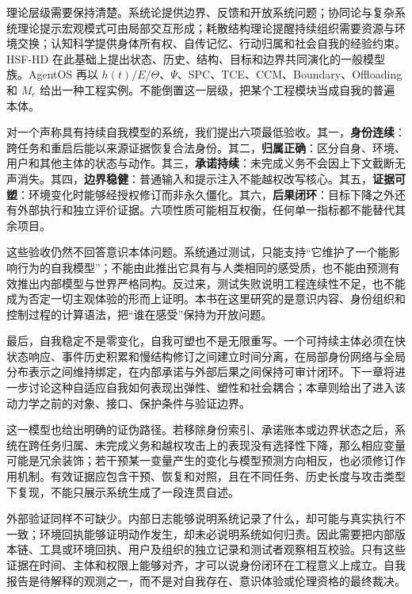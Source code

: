 理论层级需要保持清楚。系统论提供边界、反馈和开放系统问题；协同论与复杂系统理论提示宏观模式可由局部交互形成；耗散结构理论提醒持续组织需要资源与环境交换；认知科学提供身体所有权、自传记忆、行动归属和社会自我的经验约束。HSF-HD 在此基础上提出状态、历史、结构、目标和边界共同演化的一般模型族。AgentOS 再以 $h(t)/E/\Theta$、$\Psi$、SPC、TCE、CCM、Boundary、Offloading 和 $M_e$ 给出一种工程实例。不能倒置这一层级，把某个工程模块当成自我的普遍本体。

对一个声称具有持续自我模型的系统，我们提出六项最低验收。其一，\textbf{身份连续}：跨任务和重启后能以来源证据恢复合法身份。其二，\textbf{归属正确}：区分自身、环境、用户和其他主体的状态与动作。其三，\textbf{承诺持续}：未完成义务不会因上下文截断无声消失。其四，\textbf{边界稳健}：普通输入和提示注入不能越权改写核心。其五，\textbf{证据可塑}：环境变化时能够经授权修订而非永久僵化。其六，\textbf{后果闭环}：目标下降之外还有外部执行和独立评价证据。六项性质可能相互权衡，任何单一指标都不能替代其余项目。

这些验收仍然不回答意识本体问题。系统通过测试，只能支持“它维护了一个能影响行为的自我模型”；不能由此推出它具有与人类相同的感受质，也不能由预测有效推出内部模型与世界严格同构。反过来，测试失败说明工程连续性不足，也不能成为否定一切主观体验的形而上证明。本书在这里研究的是意识内容、身份组织和控制过程的计算语法，把“谁在感受”保持为开放问题。

最后，自我稳定不是零变化，自我可塑也不是无限重写。一个可持续主体必须在快状态响应、事件历史积累和慢结构修订之间建立时间分离，在局部身份网络与全局分布表示之间维持绑定，在内部承诺与外部后果之间保持可审计闭环。下一章将进一步讨论这种自适应自我如何表现出弹性、塑性和社会耦合；本章则给出了进入该动力学之前的对象、接口、保护条件与验证边界。

这一模型也给出明确的证伪路径。若移除身份索引、承诺账本或边界状态之后，系统在跨任务归属、未完成义务和越权攻击上的表现没有选择性下降，那么相应变量可能是冗余装饰；若干预某一变量产生的变化与模型预测方向相反，也必须修订作用机制。有效证据应包含干预、恢复和对照，且在不同任务、历史长度与攻击类型下复现，不能只展示系统生成了一段连贯自述。

外部验证同样不可缺少。内部日志能够说明系统记录了什么，却可能与真实执行不一致；环境回执能够证明动作发生，却未必说明系统如何归责。因此需要把内部版本链、工具或环境回执、用户及组织的独立记录和测试者观察相互校验。只有这些证据在时间、主体和权限上能够对齐，才可以说身份闭环在工程意义上成立。自我报告是待解释的观测之一，而不是对自我存在、意识体验或伦理资格的最终裁决。

